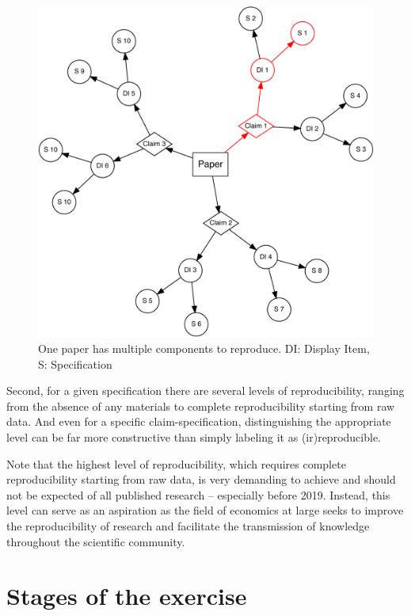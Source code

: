\documentclass[]{book}
\begin{document}
\begin{figure}
\centering
\includegraphics{01-intro_files/figure-latex/diagram-1.pdf}
\caption{\label{fig:diagram}One paper has multiple components to reproduce. DI: Display Item, S: Specification}
\end{figure}

Second, for a given specification there are several levels of reproducibility, ranging from the absence of any materials to complete reproducibility starting from raw data. And even for a specific claim-specification, distinguishing the appropriate level can be far more constructive than simply labeling it as (ir)reproducible.

Note that the highest level of reproducibility, which requires complete reproducibility starting from raw data, is very demanding to achieve and should not be expected of all published research -- especially before 2019. Instead, this level can serve as an aspiration as the field of economics at large seeks to improve the reproducibility of research and facilitate the transmission of knowledge throughout the scientific community.

\hypertarget{stages-of-the-exercise}{%
\section*{Stages of the exercise}\label{stages-of-the-exercise}}
\end{document}

